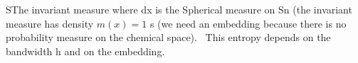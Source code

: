 SThe invariant measure where dx is the Spherical measure on Sn (the invariant measure has density $m(x)=1$ s (we need an embedding because there is no probability measure on the chemical space). 
This entropy depends on the bandwidth h and on the embedding.
